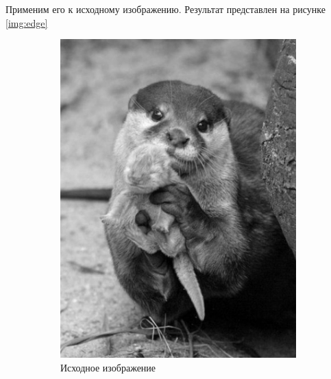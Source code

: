 Применим его к исходному изображению. Результат представлен на рисунке \ref{img:edge}

\begin{figure}[ht!]
    \centering
    \begin{subfigure}[b]{0.5\linewidth}
        \centering
        \includegraphics[width=0.95\linewidth]{bw.png}
        \caption{Исходное изображение}
    \end{subfigure}%
    \begin{subfigure}[b]{0.5\linewidth}
        \centering

\end{subfigure}
\end{figure}

